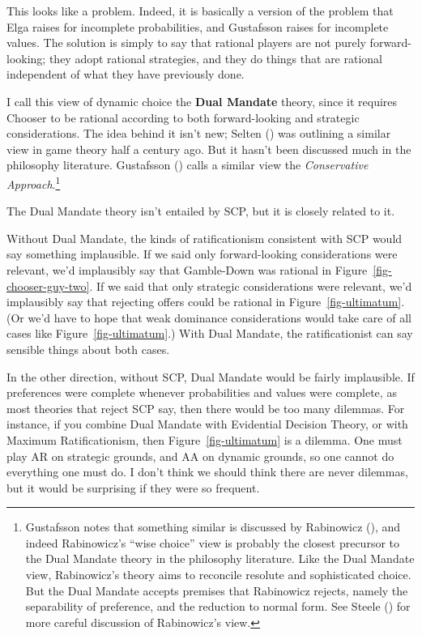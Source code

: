 \documentclass[
  10pt,
  letterpaper,
  DIV=11,
  numbers=noendperiod,
  twoside]{scrartcl}
\begin{document}
This looks like a problem. Indeed, it is basically a version of the
problem that Elga raises for incomplete probabilities, and Gustafsson
raises for incomplete values. The solution is simply to say that
rational players are not purely forward-looking; they adopt rational
strategies, and they do things that are rational independent of what
they have previously done.

I call this view of dynamic choice the \textbf{Dual Mandate} theory,
since it requires Chooser to be rational according to both
forward-looking and strategic considerations. The idea behind it isn't
new; Selten () was outlining a similar
view in game theory half a century ago. But it hasn't been discussed
much in the philosophy literature. Gustafsson
() calls a similar view the
\emph{Conservative Approach}.\footnote{Gustafsson notes that something
  similar is discussed by Rabinowicz
  (), and indeed Rabinowicz's ``wise
  choice'' view is probably the closest precursor to the Dual Mandate
  theory in the philosophy literature. Like the Dual Mandate view,
  Rabinowicz's theory aims to reconcile resolute and sophisticated
  choice. But the Dual Mandate accepts premises that Rabinowicz rejects,
  namely the separability of preference, and the reduction to normal
  form. See Steele () for more careful
  discussion of Rabinowicz's view.}

The Dual Mandate theory isn't entailed by SCP, but it is closely related
to it.

Without Dual Mandate, the kinds of ratificationism consistent with SCP
would say something implausible. If we said only forward-looking
considerations were relevant, we'd implausibly say that Gamble-Down was
rational in Figure~\ref{fig-chooser-guy-two}. If we said that only
strategic considerations were relevant, we'd implausibly say that
rejecting offers could be rational in Figure~\ref{fig-ultimatum}. (Or
we'd have to hope that weak dominance considerations would take care of
all cases like Figure~\ref{fig-ultimatum}.) With Dual Mandate, the
ratificationist can say sensible things about both cases.

In the other direction, without SCP, Dual Mandate would be fairly
implausible. If preferences were complete whenever probabilities and
values were complete, as most theories that reject SCP say, then there
would be too many dilemmas. For instance, if you combine Dual Mandate
with Evidential Decision Theory, or with Maximum Ratificationism, then
Figure~\ref{fig-ultimatum} is a dilemma. One must play AR on strategic
grounds, and AA on dynamic grounds, so one cannot do everything one must
do. I don't think we should think there are never dilemmas, but it would
be surprising if they were so frequent.
\end{document}
